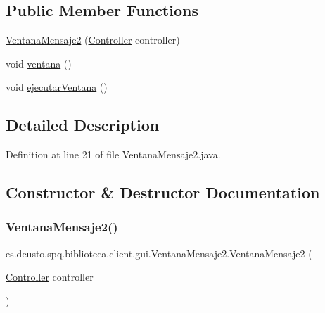 \subsection*{Public Member Functions}
\begin{DoxyCompactItemize}
\item 
\mbox{\hyperlink{classes_1_1deusto_1_1spq_1_1biblioteca_1_1client_1_1gui_1_1_ventana_mensaje2_a0b7e5a8cdef3b609d95df34761ee5d89}{Ventana\+Mensaje2}} (\mbox{\hyperlink{classes_1_1deusto_1_1spq_1_1biblioteca_1_1controller_1_1_controller}{Controller}} controller)
\item 
void \mbox{\hyperlink{classes_1_1deusto_1_1spq_1_1biblioteca_1_1client_1_1gui_1_1_ventana_mensaje2_a58e122a68c01e47a8ef6f9e9e2d54ca3}{ventana}} ()
\item 
void \mbox{\hyperlink{classes_1_1deusto_1_1spq_1_1biblioteca_1_1client_1_1gui_1_1_ventana_mensaje2_a5cfb6fe1ffdd87b816f2fb653f5a172a}{ejecutar\+Ventana}} ()
\end{DoxyCompactItemize}


\subsection{Detailed Description}


Definition at line 21 of file Ventana\+Mensaje2.\+java.



\subsection{Constructor \& Destructor Documentation}
\mbox{\label{classes_1_1deusto_1_1spq_1_1biblioteca_1_1client_1_1gui_1_1_ventana_mensaje2_a0b7e5a8cdef3b609d95df34761ee5d89}} 
\subsubsection{\texorpdfstring{Ventana\+Mensaje2()}{VentanaMensaje2()}}
{\footnotesize\ttfamily es.\+deusto.\+spq.\+biblioteca.\+client.\+gui.\+Ventana\+Mensaje2.\+Ventana\+Mensaje2 (\begin{DoxyParamCaption}\item[{\mbox{\hyperlink{classes_1_1deusto_1_1spq_1_1biblioteca_1_1controller_1_1_controller}{Controller}}}]{controller }\end{DoxyParamCaption})}

